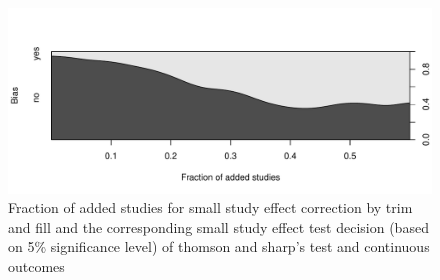 \documentclass[11pt,a4paper,twoside]{book}\usepackage[]{graphicx}\usepackage[]{color}
\newenvironment{knitrout}{}{} %
\begin{document}
\begin{figure}
\begin{knitrout}
\color{fgcolor}

{\centering \includegraphics[width=\textwidth-3cm]{figure/ch02_figunnamed-chunk-28-1} 

}



\end{knitrout}
\caption{Fraction of added studies for small study effect correction by trim and fill and the corresponding small study effect test decision (based on 5\% significance level) of thomson and sharp's test and continuous outcomes}
\label{trimfill.pvalues.cont}
\end{figure}
\end{document}
